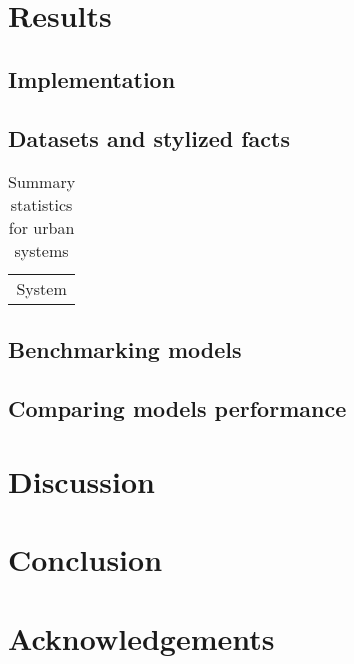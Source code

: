 \documentclass[alpha-refs]{wiley-article}
\begin{document}
\section{Results}

\subsection{Implementation}


\subsection{Datasets and stylized facts}



\begin{table}
	\caption{Summary statistics for urban systems}
	\begin{tabular}{|c|}
		System \\
	\end{tabular}
\end{table}




\subsection{Benchmarking models}


\subsection{Comparing models performance}




\section{Discussion}






\section{Conclusion}





\section*{Acknowledgements}
\end{document}
